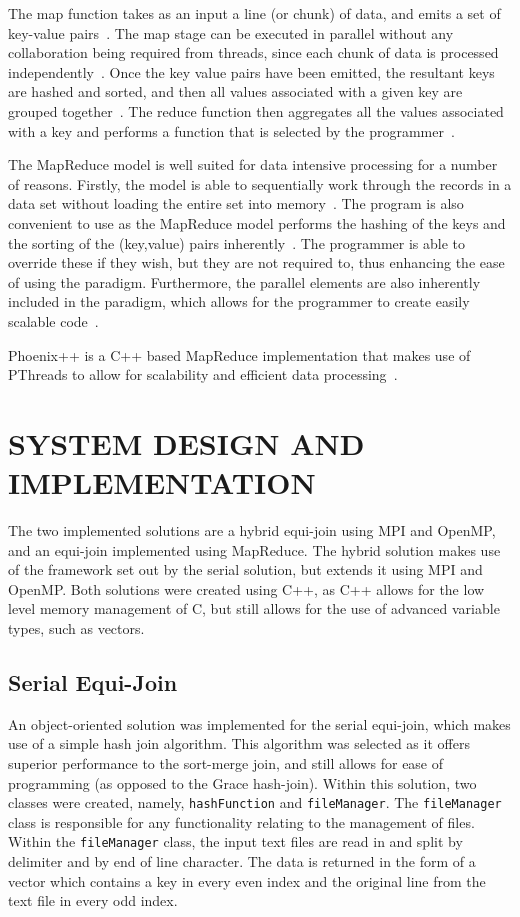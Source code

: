 \documentclass[12pt,twocolumn]{witseiepaper}
\begin{document}
The map function takes as an input a line (or chunk) of data, and emits a set of key-value pairs~\cite{phoenix}. The map stage can be executed in parallel without any collaboration being required from threads, since each chunk of data is processed independently~\cite{comparingMPIMapReduce}. Once the key value pairs have been emitted, the resultant keys are hashed and sorted, and then all values associated with a given key are grouped together~\cite{phoenix}. The reduce function then aggregates all the values associated with a key and performs a function that is selected by the programmer~\cite{comparingMPIMapReduce}.

The MapReduce model is well suited for data intensive processing for a number of reasons. Firstly, the model is able to sequentially work through the records in a data set without loading the entire set into memory~\cite{comparingMPIMapReduce}. The program is also convenient to use as the MapReduce model performs the hashing of the keys and the sorting of the (key,value) pairs inherently~\cite{phoenix}. The programmer is able to override these if they wish, but they are not required to, thus enhancing the ease of using the paradigm. Furthermore, the parallel elements are also inherently included in the paradigm, which allows for the programmer to create easily scalable code~\cite{comparingMPIMapReduce}. 

Phoenix++ is a C++ based MapReduce implementation that makes use of PThreads to allow for scalability and efficient data processing~\cite{phoenix}.

\section{SYSTEM DESIGN AND IMPLEMENTATION}
The two implemented solutions are a hybrid equi-join using MPI and OpenMP, and an equi-join implemented using MapReduce. The hybrid solution makes use of the framework set out by the serial solution, but extends it using MPI and OpenMP. Both solutions were created using C++, as C++ allows for the low level memory management of C, but still allows for the use of advanced variable types, such as vectors.

\subsection{Serial Equi-Join}
An object-oriented solution was implemented for the serial equi-join, which makes use of a simple hash join algorithm. This algorithm was selected as it offers superior performance to the sort-merge join, and still allows for ease of programming (as opposed to the Grace hash-join). Within this solution, two classes were created, namely, \texttt{hashFunction} and \texttt{fileManager}. The \texttt{fileManager} class is responsible for any functionality relating to the management of files. Within the \texttt{fileManager} class, the input text files are read in and split by delimiter and by end of line character. The data is returned in the form of a vector which contains a key in every even index and the original line from the text file in every odd index.
\end{document}
